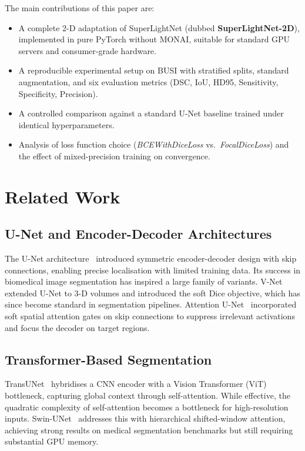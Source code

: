 \documentclass[conference]{IEEEtran}
\begin{document}
The main contributions of this paper are:
\begin{itemize}
  \item A complete 2-D adaptation of SuperLightNet (dubbed
        \textbf{SuperLightNet-2D}), implemented in pure PyTorch
        without MONAI, suitable for standard GPU servers and
        consumer-grade hardware.
  \item A reproducible experimental setup on BUSI with stratified
        splits, standard augmentation, and six evaluation metrics
        (DSC, IoU, HD95, Sensitivity, Specificity, Precision).
  \item A controlled comparison against a standard U-Net baseline
        trained under identical hyperparameters.
  \item Analysis of loss function choice (\textit{BCEWithDiceLoss}
        vs.\ \textit{FocalDiceLoss}) and the effect of mixed-precision
        training on convergence.
\end{itemize}

\section{Related Work}

\subsection{U-Net and Encoder-Decoder Architectures}

The U-Net architecture~\cite{ronneberger2015u} introduced symmetric
encoder-decoder design with skip connections, enabling precise
localisation with limited training data. Its success in biomedical
image segmentation has inspired a large family of variants. V-Net
\cite{milletari2016v} extended U-Net to 3-D volumes and introduced
the soft Dice objective, which has since become standard in
segmentation pipelines. Attention U-Net~\cite{oktay2018attention}
incorporated soft spatial attention gates on skip connections to
suppress irrelevant activations and focus the decoder on target
regions.

\subsection{Transformer-Based Segmentation}

TransUNet~\cite{chen2021transunet} hybridises a CNN encoder with a
Vision Transformer (ViT) bottleneck, capturing global context through
self-attention. While effective, the quadratic complexity of
self-attention becomes a bottleneck for high-resolution inputs.
Swin-UNet~\cite{cao2022swin} addresses this with hierarchical
shifted-window attention, achieving strong results on medical
segmentation benchmarks but still requiring substantial GPU memory.
\end{document}
